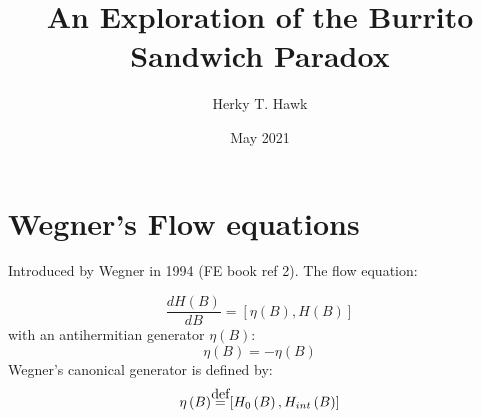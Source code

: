\documentclass[letterpaper, 11pt]{article}
\title{An Exploration of the Burrito Sandwich Paradox}
\author{Herky T. Hawk}
\date{May 2021}
\newcommand\defeq{\stackrel{\mathclap{\normalfont\mbox{def}}}{=}}
\begin{document}
\section{Wegner's Flow equations}
Introduced by Wegner in 1994 (FE book ref 2). The flow equation:

\begin{equation}
    \frac{dH\left(B\right)}{dB} = \left[\eta\left(B\right),H\left(B\right)\right]
\end{equation}
with an antihermitian generator $\eta\left(B\right)$:
\begin{equation}
    \eta\left(B\right) = -\eta\left(B\right)
\end{equation}
Wegner's canonical generator is defined by:
\begin{equation}
    \eta\left(B\right) \defeq \left[H_0\left(B\right),H_{int}\left(B\right)\right]
\end{equation}
\end{document}
